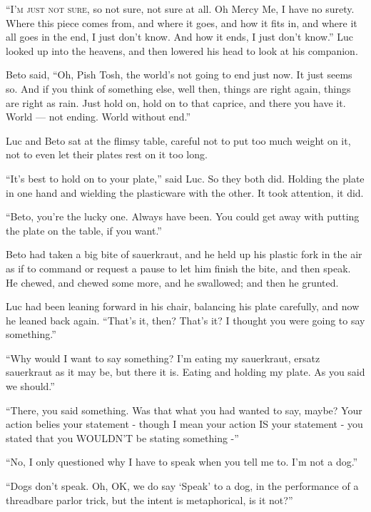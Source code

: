 
\lettrine{``I}{'m just not sure,} so not sure, not sure at all. Oh Mercy Me, I have
no surety. Where this piece comes from, and where it goes, and how it
fits in, and where it all goes in the end, I just don't know. And how it
ends, I just don't know.'' Luc looked up into the heavens, and then
lowered his head to look at his companion.

Beto said, ``Oh, Pish Tosh, the world's not going to end just now. It
just seems so. And if you think of something else, well then, things are
right again, things are right as rain. Just hold on, hold on to that
caprice, and there you have it. World --- not ending. World without end.''

Luc and Beto sat at the flimsy table, careful not to put too much weight
on it, not to even let their plates rest on it too long.

``It's best to hold on to your plate,'' said Luc. So they both did.
Holding the plate in one hand and wielding the plasticware with the
other. It took attention, it did.

``Beto, you're the lucky one. Always have been. You could get away with
putting the plate on the table, if you want.''

Beto had taken a big bite of sauerkraut, and he held up his plastic fork
in the air as if to command or request a pause to let him finish the
bite, and then speak. He chewed, and chewed some more, and he swallowed;
and then he grunted.

Luc had been leaning forward in his chair, balancing his plate
carefully, and now he leaned back again. ``That's it, then? That's it? I
thought you were going to say something.''

``Why would I want to say something? I'm eating my sauerkraut, ersatz
sauerkraut as it may be, but there it is. Eating and holding my plate.
As you said we should.''

``There, you said something. Was that what you had wanted to say, maybe?
Your action belies your statement - though I mean your action IS your
statement - you stated that you WOULDN'T be stating something -''

``No, I only questioned why I have to speak when you tell me to. I'm not
a dog.''

``Dogs don't speak. Oh, OK, we do say `Speak' to a dog, in the
performance of a threadbare parlor trick, but the intent is
metaphorical, is it not?''

